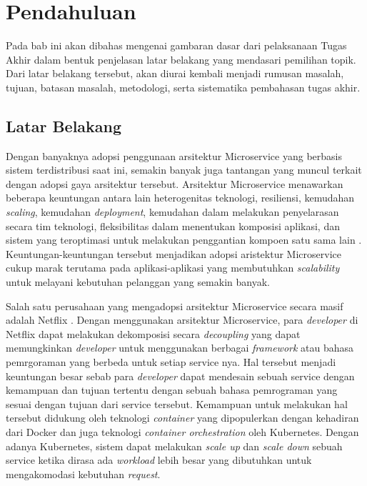 \chapter{Pendahuluan}

Pada bab ini akan dibahas mengenai gambaran dasar dari pelaksanaan Tugas Akhir dalam bentuk penjelasan latar belakang yang mendasari pemilihan topik. Dari latar belakang tersebut, akan diurai kembali menjadi rumusan masalah, tujuan, batasan masalah, metodologi, serta sistematika pembahasan tugas akhir.                                                                        

\section{Latar Belakang}


Dengan banyaknya adopsi penggunaan arsitektur Microservice yang berbasis sistem terdistribusi saat ini, semakin banyak juga tantangan yang muncul terkait dengan adopsi gaya arsitektur tersebut. Arsitektur Microservice menawarkan beberapa keuntungan antara lain heterogenitas teknologi, resiliensi, kemudahan \textit{scaling}, kemudahan \textit{deployment}, kemudahan dalam melakukan penyelarasan secara tim teknologi, fleksibilitas dalam menentukan komposisi aplikasi, dan sistem yang teroptimasi untuk melakukan penggantian kompoen satu sama lain \citep{building-microservices}. Keuntungan-keuntungan tersebut menjadikan adopsi aristektur Microservice cukup marak terutama pada aplikasi-aplikasi yang membutuhkan \textit{scalability} untuk melayani kebutuhan pelanggan yang semakin banyak.  

Salah satu perusahaan yang mengadopsi arsitektur Microservice secara masif adalah Netflix \citep{netflix-nginx, netflix-infoq}. Dengan menggunakan arsitektur Microservice, para \textit{developer} di Netflix dapat melakukan dekomposisi secara \textit{decoupling} yang dapat memungkinkan \textit{developer} untuk menggunakan berbagai \textit{framework} atau bahasa pemrgoraman yang berbeda untuk setiap service nya. Hal tersebut menjadi keuntungan besar sebab para \textit{developer} dapat mendesain sebuah service dengan kemampuan dan tujuan tertentu dengan sebuah bahasa pemrograman yang sesuai dengan tujuan dari service tersebut. Kemampuan untuk melakukan hal tersebut didukung oleh teknologi \textit{container} yang dipopulerkan dengan kehadiran dari Docker dan juga teknologi \textit{container orchestration} oleh Kubernetes. Dengan adanya Kubernetes, sistem dapat melakukan \textit{scale up} dan \textit{scale down} sebuah service ketika dirasa ada \textit{workload} lebih besar yang dibutuhkan untuk mengakomodasi kebutuhan \textit{request}.

